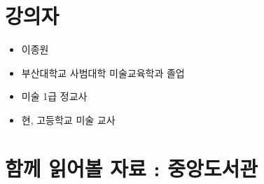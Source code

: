 \documentclass[12pt, a4paper, oneside]{book}
\let\stdsection\section
\renewcommand\section{\newpage\stdsection}
\begin{document}
%
	\section{ 강의자 }  



\begin{itemize}[					
		topsep=0.0em,			
		parsep=0.0em,			
		itemsep=0em,			
		leftmargin=	3	em,
		labelwidth=	1	em,			
		labelsep=		1	 em			
]					
	\item	이종원
	\item	부산대학교 사범대학 미술교육학과 졸업
	\item	미술 1급 정교사
	\item	현, 고등학교 미술 교사

\end{itemize}				


%
	\section{ 함께 읽어볼 자료 : 중앙도서관 } 


\end{document}
